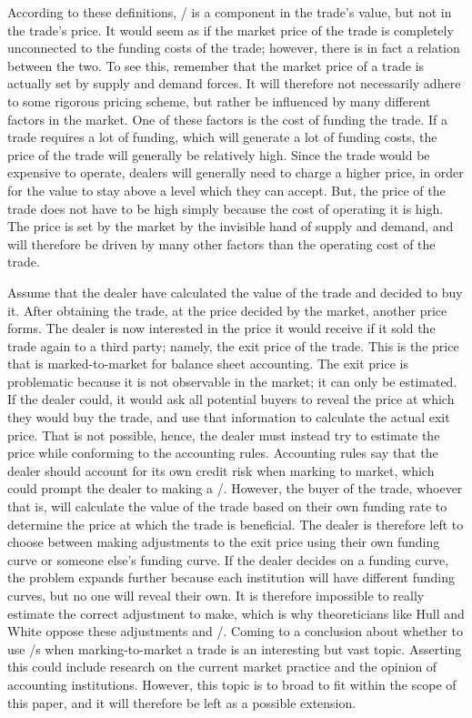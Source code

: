 \documentclass[main.tex]{subfiles}
\begin{document}
    According to these definitions, 
    \FVA/ is a component in the trade's value, but not in the trade's price. 
    It would seem as if the market price of the trade 
    is completely unconnected to the funding costs of the trade;
    however, there is in fact a relation between the two. 
    To see this, remember that the market price of a trade 
    is actually set by supply and demand forces.
    It will therefore not necessarily adhere to some rigorous pricing scheme,
    but rather be influenced by many different factors in the market.
    One of these factors is the cost of funding the trade.
    If a trade requires a lot of funding, which will generate a lot of funding costs,
    the price of the trade will generally be relatively high.
    Since the trade would be expensive to operate, 
    dealers will generally need to charge a higher price, 
    in order for the value to stay above a level which they can accept.
    But, the price of the trade does not have to be high 
    simply because the cost of operating it is high.
    The price is set by the market by the invisible hand of supply and demand,
    and will therefore be driven by many other factors than the operating cost of the trade.

    Assume that the dealer have calculated the value of the trade and decided to buy it.
    After obtaining the trade, at the price decided by the market, another price forms. 
    The dealer is now interested in the price it would receive 
    if it sold the trade again to a third party; namely, the exit price of the trade.
    This is the price that is marked-to-market for balance sheet accounting.
    The exit price is problematic because it is not observable in the market; 
    it can only be estimated.
    If the dealer could, it would ask all potential buyers to reveal the price 
    at which they would buy the trade, and use that information to calculate the actual exit price.
    That is not possible, hence, the dealer must instead try to estimate the price
    while conforming to the accounting rules.
    Accounting rules say that the dealer should account for its own credit risk 
    when marking to market, which could prompt the dealer to making a \DVA/.
    However, the buyer of the trade, whoever that is, will calculate the value of the trade
    based on their own funding rate to determine the price at which the trade is beneficial.
    The dealer is therefore left to choose between making adjustments to the exit price
    using their own funding curve or someone else's funding curve.
    If the dealer decides on a funding curve, the problem expands further
    because each institution will have different funding curves, but no one will reveal their own.
    It is therefore impossible to really estimate the correct adjustment to make,
    which is why theoreticians like Hull and White oppose these adjustments and \FVA/.
    Coming to a conclusion about whether to use \FVA/s when marking-to-market a trade
    is an interesting but vast topic.
    Asserting this could include research on the current market practice and
    the opinion of accounting institutions.
    However, this topic is to broad to fit within the scope of this paper,
    and it will therefore be left as a possible extension.
\end{document}
